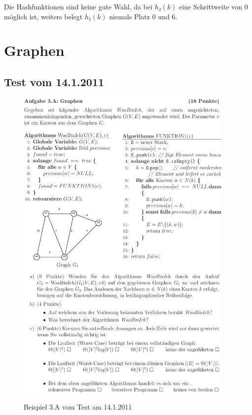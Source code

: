 \documentclass[a4paper, 12pt]{article}
\begin{document}
Die Hashfunktionen sind keine gute Wahl, da bei $h₂\left(k\right)$ eine Schrittweite von 0 möglich ist, weiters belegt $h₁\left(k\right)$ niemals Platz 0 und 6.

\section{Graphen}

\subsection{Test vom 14.1.2011}

\begin{figure}[htbp]
	\caption{Beispiel 3.A vom Test am 14.1.2011}
	\vskip 0.2cm
	\centering
	\includegraphics[width=0.95\textwidth]{Figures/Test_2011-01-14_3A}
	\label{figure:Test_2011-01-14_3A}
\end{figure}
\end{document}
